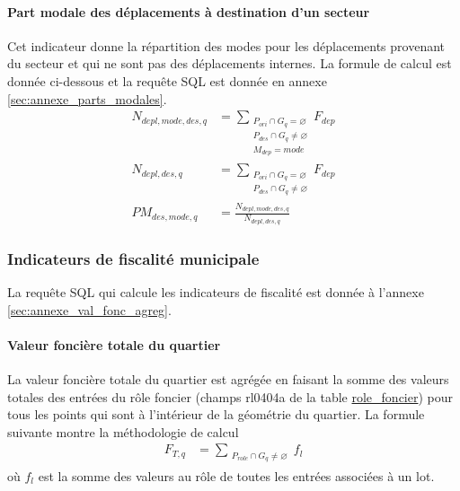             \paragraph{Part modale des déplacements à destination d'un secteur }Cet indicateur donne la répartition des modes pour les déplacements provenant du secteur et qui ne sont pas des déplacements internes. La formule de calcul est donnée ci-dessous et la requête SQL est donnée en annexe \ref{sec:annexe_parts_modales}.
            \begin{align}
                N_{depl,mode,des,q} &= \sum_{\substack{P_{ori}  \cap G_q=\varnothing \\ P_{des} \cap G_q\neq\varnothing \\ M_{dep}=mode}}{F_{dep}}   \\
                N_{depl,des,q} &= \sum_{\substack{P_{ori} \cap G_q=\varnothing \\ P_{des} \cap G_q\neq\varnothing}}{F_{dep}} \\
                PM_{des,mode,q} &= \frac{N_{depl,mode,des,q}}{N_{depl,des,q}} \label{eq:pm-des}
            \end{align}
    
    
        \subsubsection{Indicateurs de fiscalité municipale}
        La requête SQL qui calcule les indicateurs de fiscalité est donnée à l'annexe \ref{sec:annexe_val_fonc_agreg}.
            \paragraph{Valeur foncière totale du quartier} La valeur foncière totale du quartier est agrégée en faisant la somme des valeurs totales des entrées du rôle foncier (champs rl0404a de la table \ul{role\_foncier}) pour tous les points qui sont à l'intérieur de la géométrie du quartier. La formule suivante montre la méthodologie de calcul
            \begin{align}
                F_{T,q} &= \sum_{\substack{ P_{role}\cap G_q\neq\varnothing}}{f_{l}}\label{eq:val-tot-quart}
            \end{align}
            où $f_l$ est la somme des valeurs au rôle de toutes les entrées associées à un lot.
